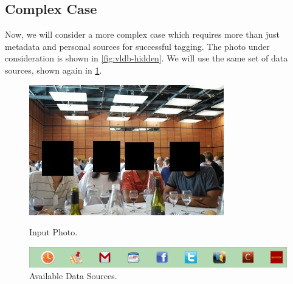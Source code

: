 



\subsection{Complex Case}
Now, we will consider a more complex case which requires more than just metadata and personal sources for successful tagging. The photo under consideration is shown in \ref{fig:vldb-hidden}. We will use the same set of data sources, shown again in \ref{fig:vldb-sources}.

\begin{figure}[ht]
\begin{minipage}[b]{0.45\linewidth}
\centering
\includegraphics[width=\textwidth]{media/chapter4/stacktrace/vldb-hide-all.jpg}
\caption{Input Photo.}
\label{fig:vldb-hidden}
\end{minipage}
\hspace{0.5cm}
\begin{minipage}[b]{0.45\linewidth}
\centering
\includegraphics[width=\textwidth]{media/chapter4/stacktrace/sources.png}
\caption{Available Data Sources.}
\label{fig:vldb-sources}
\end{minipage}
\end{figure}

